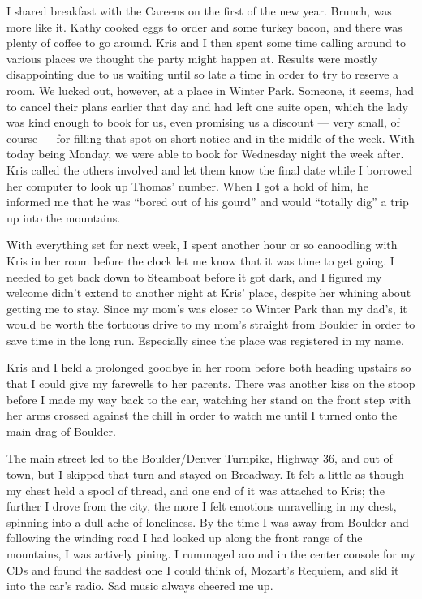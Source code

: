 I shared breakfast with the Careens on the first of the new year.  Brunch, was more like it.  Kathy cooked eggs to order and some turkey bacon, and there was plenty of coffee to go around.  Kris and I then spent some time calling around to various places we thought the party might happen at.  Results were mostly disappointing due to us waiting until so late a time in order to try to reserve a room.  We lucked out, however, at a place in Winter Park.  Someone, it seems, had to cancel their plans earlier that day and had left one suite open, which the lady was kind enough to book for us, even promising us a discount --- very small, of course --- for filling that spot on short notice and in the middle of the week.  With today being Monday, we were able to book for Wednesday night the week after.  Kris called the others involved and let them know the final date while I borrowed her computer to look up Thomas' number.  When I got a hold of him, he informed me that he was ``bored out of his gourd'' and would ``totally dig'' a trip up into the mountains.

With everything set for next week, I spent another hour or so canoodling with Kris in her room before the clock let me know that it was time to get going.  I needed to get back down to Steamboat before it got dark, and I figured my welcome didn't extend to another night at Kris' place, despite her whining about getting me to stay.  Since my mom's was closer to Winter Park than my dad's, it would be worth the tortuous drive to my mom's straight from Boulder in order to save time in the long run.  Especially since the place was registered in my name.

Kris and I held a prolonged goodbye in her room before both heading upstairs so that I could give my farewells to her parents.  There was another kiss on the stoop before I made my way back to the car, watching her stand on the front step with her arms crossed against the chill in order to watch me until I turned onto the main drag of Boulder.

The main street led to the Boulder/Denver Turnpike, Highway 36, and out of town, but I skipped that turn and stayed on Broadway.  It felt a little as though my chest held a spool of thread, and one end of it was attached to Kris; the further I drove from the city, the more I felt emotions unravelling in my chest, spinning into a dull ache of loneliness.  By the time I was away from Boulder and following the winding road I had looked up along the front range of the mountains, I was actively pining.  I rummaged around in the center console for my CDs and found the saddest one I could think of, Mozart's Requiem, and slid it into the car's radio.  Sad music always cheered me up.

